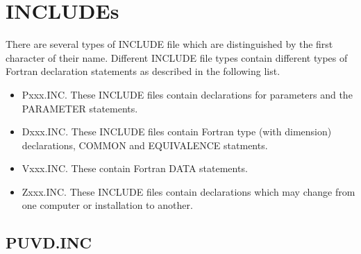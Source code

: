 \section{INCLUDEs}
There are several types of INCLUDE file which are distinguished by the
first character of their name.  Different INCLUDE file types contain
different types of Fortran declaration statements as described in the
following list.
\begin{itemize} %
\item Pxxx.INC.  These INCLUDE files contain declarations for parameters and
the PARAMETER statements.
\item Dxxx.INC.  These INCLUDE files contain Fortran type (with dimension)
declarations, COMMON and EQUIVALENCE statments.
\item Vxxx.INC.  These contain Fortran DATA statements.
\item Zxxx.INC.  These INCLUDE files contain declarations which may change
from one computer or installation to another.

\end{itemize} %
\subsection{PUVD.INC}

